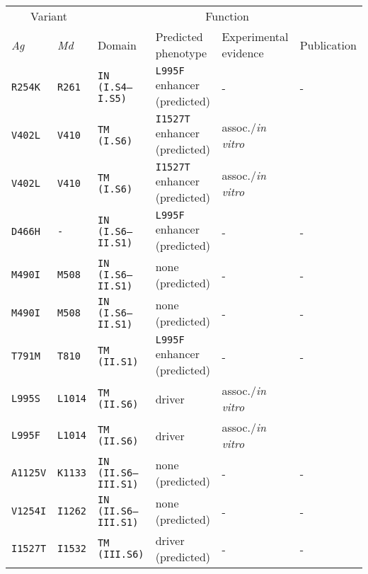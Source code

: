 
\begin{tabular}{llllll}
\toprule
\multicolumn{2}{c}{Variant} &
\multicolumn{4}{c}{Function}\\
\cmidrule(r){1-2}
\cmidrule(r){3-6}
\emph{Ag} & 
\emph{Md} & Domain\tnote{1} & 
Predicted phenotype\tnote{2} &
Experimental evidence\tnote{3} &
Publication\\
\midrule

\texttt{R254K} & \texttt{R261} & \texttt{IN (I.S4--I.S5)} & \texttt{L995F} enhancer (predicted) & - & - \\

\texttt{V402L} & \texttt{V410} & \texttt{TM (I.S6)} & \texttt{I1527T} enhancer (predicted) & assoc./\emph{in vitro} & \cite{Yoon2008,Hopkins2010,Park1997,Lee2013} \\

\texttt{V402L} & \texttt{V410} & \texttt{TM (I.S6)} & \texttt{I1527T} enhancer (predicted) & assoc./\emph{in vitro} & \cite{Yoon2008,Hopkins2010,Park1997,Lee2013} \\

\texttt{D466H} & \texttt{-} & \texttt{IN (I.S6--II.S1)} & \texttt{L995F} enhancer (predicted) & - & - \\

\texttt{M490I} & \texttt{M508} & \texttt{IN (I.S6--II.S1)} & none (predicted) & - & - \\

\texttt{M490I} & \texttt{M508} & \texttt{IN (I.S6--II.S1)} & none (predicted) & - & - \\

\texttt{T791M} & \texttt{T810} & \texttt{TM (II.S1)} & \texttt{L995F} enhancer (predicted) & - & - \\

\texttt{L995S} & \texttt{L1014} & \texttt{TM (II.S6)} & driver & assoc./\emph{in vitro} & \cite{Burton2011} \\

\texttt{L995F} & \texttt{L1014} & \texttt{TM (II.S6)} & driver & assoc./\emph{in vitro} & \cite{Burton2011} \\

\texttt{A1125V} & \texttt{K1133} & \texttt{IN (II.S6--III.S1)} & none (predicted) & - & - \\

\texttt{V1254I} & \texttt{I1262} & \texttt{IN (II.S6--III.S1)} & none (predicted) & - & - \\

\texttt{I1527T} & \texttt{I1532} & \texttt{TM (III.S6)} & driver (predicted) & - & - \\


\end{tabular}
